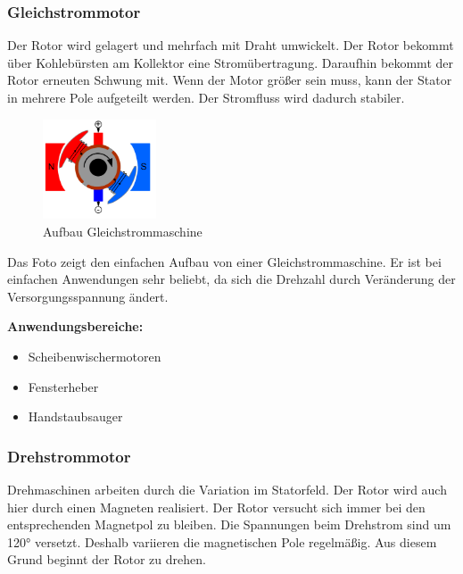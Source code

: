 \documentclass[12pt]{scrreprt} %
\begin{document}
\subsubsection{Gleichstrommotor}
\label{sec:gleichstrommotor}

Der Rotor wird gelagert und mehrfach mit Draht umwickelt. Der Rotor bekommt über Kohlebürsten am Kollektor eine Stromübertragung. Daraufhin bekommt der Rotor erneuten Schwung mit.
Wenn der Motor größer sein muss, kann der Stator in mehrere Pole aufgeteilt werden. Der Stromfluss wird dadurch stabiler.

\begin{figure}[!ht]
\begin{center}
	\caption{Aufbau Gleichstrommaschine}
	\includegraphics[width=0.3\textwidth]{Gleichstommaschine}
\end{center}
\end{figure}

Das Foto zeigt den einfachen Aufbau von einer Gleichstrommaschine. Er ist bei einfachen Anwendungen sehr beliebt, da sich die Drehzahl durch Veränderung der Versorgungsspannung ändert.\newline

\textbf{Anwendungsbereiche:}

\begin{itemize}
	\item{Scheibenwischermotoren}
	\item{Fensterheber}
	\item{Handstaubsauger}
\end{itemize}

\subsubsection{Drehstrommotor}
\label{sec:drehstrom}

Drehmaschinen arbeiten durch die Variation im Statorfeld. Der Rotor wird auch hier durch einen Magneten realisiert. Der Rotor versucht sich immer bei den entsprechenden Magnetpol zu bleiben. Die Spannungen beim Drehstrom sind um 120° versetzt. Deshalb variieren die magnetischen Pole regelmäßig. Aus diesem Grund beginnt der Rotor zu drehen.
\end{document}
